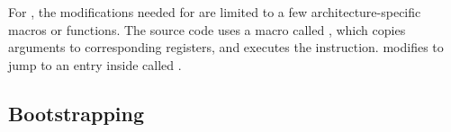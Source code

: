 For \glibc{}, the modifications
needed for \graphene{}
are limited to a few architecture-specific macros or functions.
The \glibc{} source code uses a macro called
,
which copies \linuxapi{} arguments to corresponding registers, and executes the  instruction.
\graphene{} modifies 
to jump to an entry inside \thelibos{} called .




\subsection{Bootstrapping}






